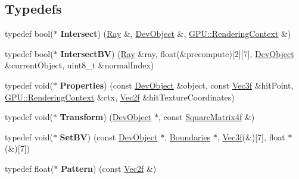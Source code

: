 \subsection*{Typedefs}
\begin{DoxyCompactItemize}
\item 
typedef bool($\ast$ {\bfseries Intersect}) (\hyperlink{class_ray}{Ray} \&, \hyperlink{class_dev_object}{Dev\+Object} \&, \hyperlink{struct_g_p_u_1_1_rendering_context}{G\+P\+U\+::\+Rendering\+Context} \&)\hypertarget{group__device__pointers_gadd5691b4d1b8e3d72a8b279063574170}{}\label{group__device__pointers_gadd5691b4d1b8e3d72a8b279063574170}

\item 
typedef bool($\ast$ {\bfseries Intersect\+BV}) (\hyperlink{class_ray}{Ray} \&ray, float(\&precompute)\mbox{[}2\mbox{]}\mbox{[}7\mbox{]}, \hyperlink{class_dev_object}{Dev\+Object} \&current\+Object, uint8\+\_\+t \&normal\+Index)\hypertarget{group__device__pointers_ga651ba9f838240bd32d8ad85a1deec6ce}{}\label{group__device__pointers_ga651ba9f838240bd32d8ad85a1deec6ce}

\item 
typedef void($\ast$ {\bfseries Properties}) (const \hyperlink{class_dev_object}{Dev\+Object} \&object, const \hyperlink{class_vec3}{Vec3f} \&hit\+Point, \hyperlink{struct_g_p_u_1_1_rendering_context}{G\+P\+U\+::\+Rendering\+Context} \&ctx, \hyperlink{class_vec2}{Vec2f} \&hit\+Texture\+Coordinates)\hypertarget{group__device__pointers_ga3db4cb2abc6918447914228ab5019d38}{}\label{group__device__pointers_ga3db4cb2abc6918447914228ab5019d38}

\item 
typedef void($\ast$ {\bfseries Transform}) (\hyperlink{class_dev_object}{Dev\+Object} $\ast$, const \hyperlink{class_square_matrix4}{Square\+Matrix4f} \&)\hypertarget{group__device__pointers_ga7342a43dc846e3462f53f5af48daeab2}{}\label{group__device__pointers_ga7342a43dc846e3462f53f5af48daeab2}

\item 
typedef void($\ast$ {\bfseries Set\+BV}) (const \hyperlink{class_dev_object}{Dev\+Object} $\ast$, \hyperlink{class_boundaries}{Boundaries} $\ast$, \hyperlink{class_vec3}{Vec3f}(\&)\mbox{[}7\mbox{]}, float $\ast$(\&)\mbox{[}7\mbox{]})\hypertarget{group__device__pointers_gaf734749a4b67aed1bb494cb8000f870d}{}\label{group__device__pointers_gaf734749a4b67aed1bb494cb8000f870d}

\item 
typedef float($\ast$ {\bfseries Pattern}) (const \hyperlink{class_vec2}{Vec2f} \&)\hypertarget{group__device__pointers_gacb1d13948594101a67c3ec975d34e9b8}{}\label{group__device__pointers_gacb1d13948594101a67c3ec975d34e9b8}

\end{DoxyCompactItemize}
